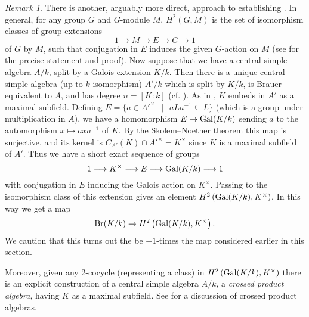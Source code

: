 \documentclass[11pt]{amsart}
\numberwithin{equation}{section}
\newtheorem{cor}[equation]{Corollary}
\theoremstyle{remark}
\newtheorem{remark}[equation]{Remark}
\theoremstyle{remark}
\theoremstyle{remark}
\theoremstyle{definition}
\theoremstyle{definition}
\theoremstyle{definition}
\theoremstyle{definition}
\theoremstyle{definition}
\theoremstyle{definition}
\begin{document}
%
%

\begin{remark}
There is another, arguably more direct, approach to establishing . In general, for any group $G$ and $G$-module $M$, $H^2(G,M)$ is the set of isomorphism classes of group extensions
\[1\longrightarrow M \longrightarrow E \longrightarrow G\longrightarrow 1\]
of $G$ by $M$, such that conjugation in $E$ induces the given $G$-action on $M$ (see \cite[Example 3.2.6]{MR2266528} for the precise statement and proof). Now suppose that we have a central simple algebra $A/k$, split by a Galois extension $K/k$. Then there is a unique central simple algebra (up to $k$-isomorphism) $A'/k$ which is split by $K/k$, is Brauer equivalent to $A$, and has degree $n=[K:k]$ (cf. ). As in , $K$ embeds in $A'$ as a maximal subfield. Defining $E= \{a\in A'^\times~~\mid~~aLa^{-1}\subseteq L\}$ (which is a group under multiplication in $A$), we have a homomorphism $E\rightarrow \textup{Gal}(K/k)$ sending $a$ to the automorphism $x\mapsto axa^{-1}$ of $K$. By the Skolem--Noether theorem this map is surjective, and its kernel is $C_{A'}(K)\cap A'^\times=K^\times$ since $K$ is a maximal subfield of $A'$. Thus we have a short exact sequence of groups
\[1 \longrightarrow K^\times \longrightarrow E\longrightarrow \textup{Gal}(K/k)\longrightarrow 1\]
with conjugation in $E$ inducing the Galois action on $K^\times$. Passing to the isomorphism class of this extension gives an element $H^2\left(\textup{Gal}(K/k),K^\times\right)$. In this way we get a map
\[\textup{Br}(K/k)\rightarrow H^2\left(\textup{Gal}(K/k),K^\times\right).\]
We caution that this turns out the be $-1$-times the map considered earlier in this section. 

Moreover, given any $2$-cocycle (representing a class) in $H^2\left(\textup{Gal}(K/k),K^\times\right)$ there is an explicit construction of a central simple algebra $A/k$, a \textit{crossed product algebra}, having $K$ as a maximal subfield. See \cite[Section 8.4]{MR1009787} for a discussion of crossed product algebras. 
\end{remark}
\end{document}
